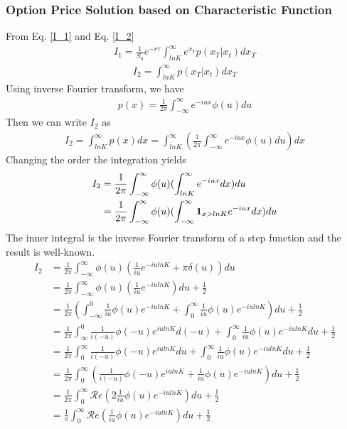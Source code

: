 \documentclass[a4paper]{article}
\begin{document}
\subsubsection{Option Price Solution based on Characteristic Function}
From Eq. \ref{I_1} and Eq. \ref{I_2}
\begin{align*}
	I_1 = \frac{1}{S_0} e^{-r \tau}\int_{lnK}^{\infty} e^{x_T} p(x_T | x_t) dx_T 
\end{align*}
\begin{align*}
	I_2 = \int_{lnK}^{\infty}  p(x_T | x_t) dx_T 
\end{align*}
Using inverse Fourier transform, we have
\begin{align*}
	p(x) = \frac{1}{2\pi} \int_{-\infty}^{\infty} e^{-iux}  \phi(u) du
\end{align*}
Then we can write $I_2$ as
\begin{align*}
	I_2  = \int_{lnK}^{\infty}  p(x) dx
	   = \int_{lnK}^{\infty} ( \frac{1}{2\pi} \int_{-\infty}^{\infty} e^{-iux}  \phi(u) du) dx
\end{align*}
Changing the order the integration yields
\begin{align*}
	I_2 & = \frac{1}{2\pi} \int_{-\infty}^{\infty}\phi(u) (\int_{lnK}^{\infty} e^{-iux}  dx) du \\
	  & = \frac{1}{2\pi} \int_{-\infty}^{\infty}\phi(u)(\int_{-\infty}^{\infty} {\bf 1}_{x > lnK}e^{-iux}dx) du\\
\end{align*}
The inner integral is the inverse Fourier transform of a step function and the result is well-known.
\begin{align*}
	I_2 & = \frac{1}{2\pi} \int_{-\infty}^{\infty}\phi(u)( \frac{1}{iu }e^{-i u lnK} + \pi \delta(u)) du \\
	  & = \frac{1}{2\pi} \int_{-\infty}^{\infty}\phi(u)( \frac{1}{iu }e^{-i u lnK} ) du + \frac{1}{2} \\
	  & = \frac{1}{2\pi} (\int_{-\infty}^{0}\frac{1}{iu}\phi(u) e^{-i u lnK} +  \int_{0}^{\infty}\frac{1}{iu }\phi(u) e^{-i u lnK}) du + \frac{1}{2} \\
	  & = \frac{1}{2\pi} \int_{\infty}^{0}\frac{1}{i(-u)}\phi(-u) e^{i u lnK}d(-u) +\int_{0}^{\infty}\frac{1}{iu }\phi(u) e^{-i u lnK}  du + \frac{1}{2} \\
	  & = \frac{1}{2\pi} \int_{0}^{\infty}\frac{1}{i(-u)}\phi(-u) e^{i u lnK}du +\int_{0}^{\infty}\frac{1}{iu }\phi(u) e^{-i u lnK}  du + \frac{1}{2} \\
	  & = \frac{1}{2\pi} \int_{0}^{\infty}(\frac{1}{i(-u)}\phi(-u) e^{i u lnK} + \frac{1}{iu}\phi(u) e^{-i u lnK})  du + \frac{1}{2} \\
	  & = \frac{1}{2\pi} \int_{0}^{\infty}\mathcal Re( 2\frac{1}{iu }\phi(u) e^{-i u lnK})  du + \frac{1}{2} \\
	  & = \frac{1}{\pi} \int_{0}^{\infty}\mathcal Re( \frac{1}{iu }\phi(u) e^{-i u lnK})  du + \frac{1}{2} \\
\end{align*}
\end{document}

